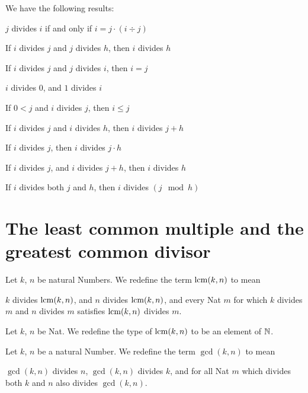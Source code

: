 \documentclass{article}
\begin{document}
We have the following results:
\begin{thm}
\item\label{natd:3} $j$ divides $i$ if and only if $i=j\cdot(i\div j)$
\item\label{natd:4} If $i$ divides $j$ and $j$ divides $h$, then $i$
  divides $h$
\item\label{natd:5} If $i$ divides $j$ and $j$ divides $i$, then $i=j$
\item\label{natd:6} $i$ divides $0$, and $1$ divides $i$ 
\item\label{natd:7} If $0<j$ and $i$ divides $j$, then $i\leq j$
\item\label{natd:8} If $i$ divides $j$ and $i$ divides $h$, then $i$
  divides $j+h$
\item\label{natd:9} If $i$ divides $j$, then $i$ divides $j\cdot h$
\item\label{natd:10} If $i$ divides $j$, and $i$ divides $j+h$, then $i$
  divides $h$
\item\label{natd:11} If $i$ divides both $j$ and $h$, then $i$ divides $(j\mod{h})$
\end{thm}

\section{The least common multiple and the greatest common divisor}

\begin{definition}
Let $k$, $n$ be natural Numbers.
We redefine the term $\operatorname{lcm}(k,n)$ to mean
\begin{defn}
\item $k$ divides $\operatorname{lcm}(k,n)$, and $n$ divides $\operatorname{lcm}(k,n)$, and  every
  Nat $m$ for which $k$ divides $m$ and $n$ divides $m$ satisfies
  $\operatorname{lcm}(k,n)$ divides $m$.
\end{defn}
\end{definition}

\begin{definition}
Let $k$, $n$ be Nat.
We redefine the type of $\operatorname{lcm}(k,n)$ to be an element of $\mathbb{N}$.
\end{definition}

\begin{definition}
Let $k$, $n$ be a natural Number.
We redefine the term $\gcd(k,n)$ to mean
\begin{defn}
\item $\gcd(k,n)$ divides $n$, $\gcd(k,n)$ divides $k$, and for all Nat
  $m$ which divides both $k$ and $n$ also divides $\gcd(k,n)$.
\end{defn}
\end{definition}
\end{document}

